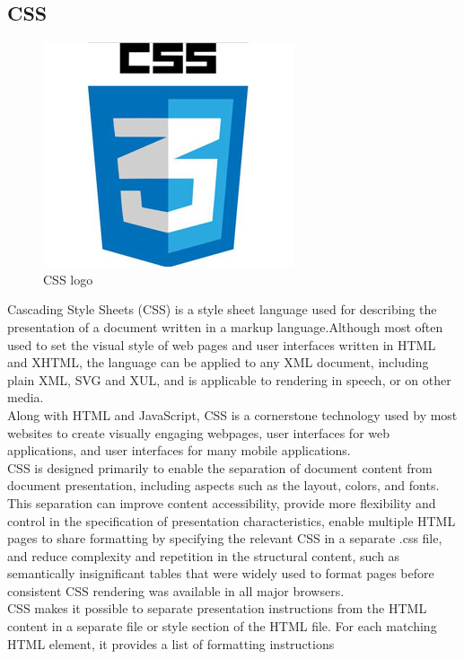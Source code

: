 \subsection{CSS}

\begin{figure}[h]
\centering \includegraphics[scale=0.50]{images/CSS.jpg}
\caption{CSS logo}
\end{figure}
Cascading Style Sheets (CSS) is a style sheet language used for describing the presentation of a document written in a markup language.Although most often used to set the visual style of web pages and user interfaces written in HTML and XHTML, the language can be applied to any XML document, including plain XML, SVG and XUL, and is applicable to rendering in speech, or on other media. \\
Along with HTML and JavaScript, CSS is a cornerstone technology used by most websites to create visually engaging webpages, user interfaces for web applications, and user interfaces for many mobile applications.\\
CSS is designed primarily to enable the separation of document content from document presentation, including aspects such as the layout, colors, and fonts.\\
 This separation can improve content accessibility, provide more flexibility and control in the specification of presentation characteristics, enable multiple HTML pages to share formatting by specifying the relevant CSS in a separate .css file, and reduce complexity and repetition in the structural content, such as semantically insignificant tables that were widely used to format pages before consistent CSS rendering was available in all major browsers.\\
 CSS makes it possible to separate presentation instructions from the HTML content in a separate file or style section of the HTML file. For each matching HTML element, it provides a list of formatting instructions

